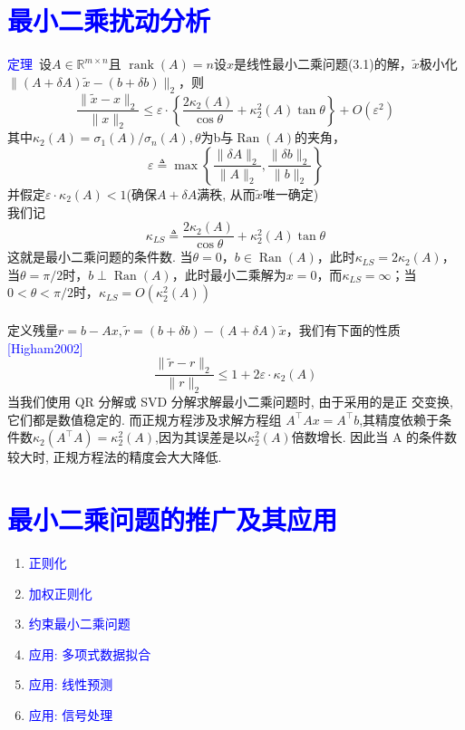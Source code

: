 \documentclass[12pt,a4paper]{article}
\begin{document}
\section{\textcolor{blue}{最小二乘扰动分析}}
\textcolor{blue}{定理}~设$A \in \mathbb{R}^{m \times n}$且
$\operatorname{rank}(A)=n$设$x$是线性最小二乘问题(3.1)的解，$\tilde{x}$极小化$\|(A+\delta A) \tilde{x}-(b+\delta b)\|_{2}$，则
$$
\frac{\|\tilde{x}-x\|_{2}}{\|x\|_{2}} \leq \varepsilon \cdot\left\{\frac{2 \kappa_{2}(A)}{\cos \theta}+\kappa_{2}^{2}(A) \tan \theta\right\}+O\left(\varepsilon^{2}\right)
$$
其中$\kappa_{2}(A)=\sigma_{1}(A) / \sigma_{n}(A), \theta$为b与$\operatorname{Ran}(A)$的夹角，
$$
\varepsilon \triangleq \max \left\{\frac{\|\delta A\|_{2}}{\|A\|_{2}}, \frac{\|\delta b\|_{2}}{\|b\|_{2}}\right\}
$$
并假定$\varepsilon \cdot \kappa_{2}(A)<1$(确保$A+\delta A$满秩, 从而$\tilde{x}$唯一确定)\\
我们记
$$
\kappa_{L S} \triangleq \frac{2 \kappa_{2}(A)}{\cos \theta}+\kappa_{2}^{2}(A) \tan \theta
$$
这就是最小二乘问题的条件数. 当$\theta=0$，$b \in \operatorname{Ran}(A)$，此时$\kappa_{L S}=2 \kappa_{2}(A)$，当$\theta=\pi / 2$时，$b \perp \operatorname{Ran}(A)$，此时最小二乘解为$x=0$，而$\kappa_{L S}=\infty$；当$0<\theta<\pi / 2$时，$\kappa_{L S}=O\left(\kappa_{2}^{2}(A)\right)$\\
\\
定义残量$r=b-A x, \tilde{r}=(b+\delta b)-(A+\delta A) \tilde{x}$，我们有下面的性质 \textcolor{blue}{[Higham2002]}
$$
\frac{\|\tilde{r}-r\|_{2}}{\|r\|_{2}} \leq 1+2 \varepsilon \cdot \kappa_{2}(A)
$$
当我们使用 QR 分解或 SVD 分解求解最小二乘问题时, 由于采用的是正 交变换, 它们都是数值稳定的. 而正规方程涉及求解方程组
$A^{\top} A x=A^{\top} b$,其精度依赖于条件数$\kappa_{2}\left(A^{\top} A\right)=\kappa_{2}^{2}(A)$,因为其误差是以$\kappa_{2}^{2}(A)$倍数增长. 因此当 A 的条件数较大时, 正规方程法的精度会大大降低.\\
\section{\textcolor{blue}{最小二乘问题的推广及其应用}}
\begin{enumerate}[8.1]
\item \textcolor{blue}{正则化}
\item \textcolor{blue}{加权正则化}
\item \textcolor{blue}{约束最小二乘问题}
\item \textcolor{blue}{应用: 多项式数据拟合}
\item \textcolor{blue}{应用: 线性预测}
\item \textcolor{blue}{应用: 信号处理}
\end{enumerate}
\end{document}

